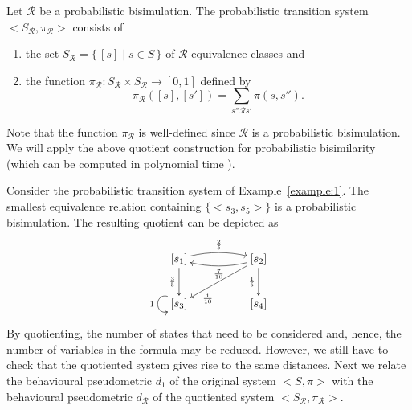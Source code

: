 \documentclass{LMCS}
\begin{document}
\begin{defi}
Let $\mathcal{R}$ be a probabilistic bisimulation.  The probabilistic transition
system $<S_{\mathcal{R}}, \pi_{\mathcal{R}}>$ consists of
\begin{enumerate}[$\bullet$]
\item
the set $S_{\mathcal{R}} = \{\, [s] \mid s \in S \,\}$ of $\mathcal{R}$-equivalence classes and 
\item
the function $\pi_{\mathcal{R}} : S_{\mathcal{R}} \times S_{\mathcal{R}} \to [0, 1]$ defined by
\begin{displaymath}
\pi_{\mathcal{R}}([s], [s']) = \sum_{s'' \mathbin{\mathcal{R}} s'} \pi(s, s'').
\end{displaymath}
\end{enumerate}
\end{defi}

Note that the function $\pi_{\mathcal{R}}$ is well-defined since $\mathcal{R}$ 
is a probabilistic bisimulation.  We will apply the above quotient 
construction for probabilistic bisimilarity (which can be computed in
polynomial time \cite{BEM00:jcss}).

\begin{exa}
Consider the probabilistic transition system of Example~\ref{example:1}.
The smallest equivalence relation containing $\{ <s_3, s_5> \}$ is a 
probabilistic bisimulation.  The resulting quotient can be depicted as
\begin{displaymath}
\UseComputerModernTips
\xymatrix@C=5em{
[s_1] \ar@/^/[r]^{\frac{2}{5}} \ar[d]_{\frac{3}{5}} & [s_2] \ar@/^/[l]^{\frac{7}{10}} \ar[d]_{\frac{1}{5}} \ar[dl]^(0.7){\frac{1}{10}}\\
[s_3] \ar@(ul,dl)_{1} & [s_4]}
\end{displaymath}
\end{exa}

By quotienting, the number of states that need to be considered and, hence,
the number of variables in the formula may be reduced.  However, we still
have to check that the quotiented system gives rise to the same distances.
Next we relate the behavioural pseudometric $d_1$ of the original system 
$<S, \pi>$ with the behavioural pseudometric $d_{\mathcal{R}}$ of the 
quotiented system $<S_{\mathcal{R}}, \pi_{\mathcal{R}}>$.
\end{document}
